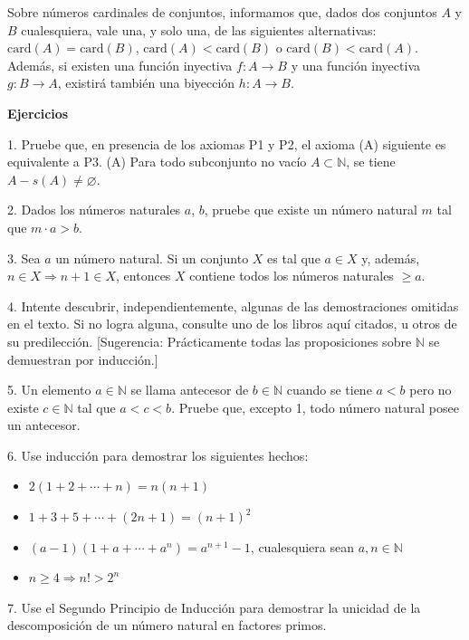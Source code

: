 Sobre números cardinales de conjuntos, informamos que, dados dos conjuntos \( A \) y \( B \) cualesquiera, vale una, y solo una, de las siguientes alternativas: \( \text{card}(A) = \text{card}(B) \), \( \text{card}(A) < \text{card}(B) \) o \( \text{card}(B) < \text{card}(A) \). Además, si existen una función inyectiva \( f : A \to B \) y una función inyectiva \( g : B \to A \), existirá también una biyección \( h : A \to B \).

\textbf{Ejercicios}

1. Pruebe que, en presencia de los axiomas P1 y P2, el axioma (A) siguiente es equivalente a P3. (A) Para todo subconjunto no vacío \( A \subset \mathbb{N} \), se tiene \( A - s(A) \neq \varnothing \).

2. Dados los números naturales \( a \), \( b \), pruebe que existe un número natural \( m \) tal que \( m \cdot a > b \).

3. Sea \( a \) un número natural. Si un conjunto \( X \) es tal que \( a \in X \) y, además, \( n \in X \Rightarrow n + 1 \in X \), entonces \( X \) contiene todos los números naturales \( \geq a \).

4. Intente descubrir, independientemente, algunas de las demostraciones omitidas en el texto. Si no logra alguna, consulte uno de los libros aquí citados, u otros de su predilección. [Sugerencia: Prácticamente todas las proposiciones sobre \( \mathbb{N} \) se demuestran por inducción.]

5. Un elemento \( a \in \mathbb{N} \) se llama antecesor de \( b \in \mathbb{N} \) cuando se tiene \( a < b \) pero no existe \( c \in \mathbb{N} \) tal que \( a < c < b \). Pruebe que, excepto 1, todo número natural posee un antecesor.

6. Use inducción para demostrar los siguientes hechos:

\begin{itemize}
    \item[a)] \( 2(1 + 2 + \cdots + n) = n(n+1) \)
    \item[b)] \( 1 + 3 + 5 + \cdots + (2n+1) = (n+1)^2 \)
    \item[c)] \( (a-1)(1 + a + \cdots + a^n) = a^{n+1} - 1 \), cualesquiera sean \( a, n \in \mathbb{N} \)
    \item[d)] \( n \geq 4 \Rightarrow n! > 2^n \)
\end{itemize}

7. Use el Segundo Principio de Inducción para demostrar la unicidad de la descomposición de un número natural en factores primos.

